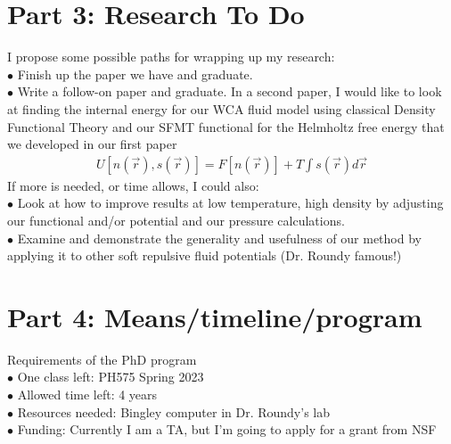 \documentclass[double,12pt]{revtex4-2}
\begin{document}
\section{Part 3: Research To Do}
\noindent %
I propose some possible paths for wrapping up my research: \\
$\bullet$ Finish up the paper we have and graduate. \\
$\bullet$ Write a follow-on paper and graduate. In a second paper, I would 
like to look at finding the internal energy for our WCA fluid model using 
classical Density Functional Theory and our SFMT functional 
for the Helmholtz free energy that we developed in our first paper 
\begin{align}
  U[n(\vec r), s(\vec r)] = F[n(\vec r)] + T\int s(\vec r) d\vec r
\end{align}
 If more is needed, or time allows, I could also: \\
$\bullet$ Look at how to improve results at low temperature, high density 
by adjusting our functional and/or potential and our pressure calculations.\\ %
$\bullet$ Examine and demonstrate the generality and usefulness of our 
method by applying it to other soft repulsive fluid potentials (Dr. Roundy famous!) \\

\section{Part 4: Means/timeline/program}
\noindent Requirements of the PhD program \\
$\bullet$ One class left: PH575 Spring 2023 \\
$\bullet$ Allowed time left: 4 years \\
$\bullet$ Resources needed: Bingley computer in Dr. Roundy's lab \\
$\bullet$ Funding: Currently I am a TA, but I'm going to apply for a grant from NSF \\
\end{document}

